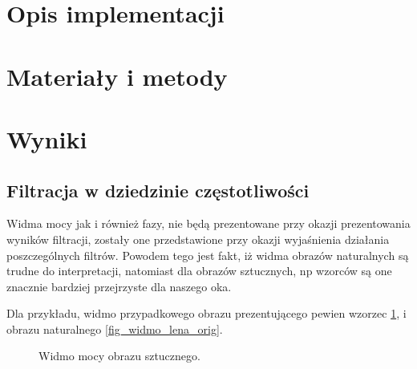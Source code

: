 \documentclass{classrep}
\begin{document}
\section{Opis implementacji}


\section{Materiały i metody}



\section{Wyniki}




\subsection{Filtracja w dziedzinie częstotliwości}

Widma mocy jak i również fazy, nie będą prezentowane przy okazji prezentowania wyników filtracji, zostały one przedstawione przy okazji wyjaśnienia działania poszczególnych filtrów. Powodem tego jest fakt, iż widma obrazów naturalnych są trudne do interpretacji, natomiast dla obrazów sztucznych, np wzorców są one znacznie bardziej przejrzyste dla naszego oka.

Dla przykładu, widmo przypadkowego obrazu prezentującego pewien wzorzec \ref{fig_pattern}, i obrazu naturalnego \ref{fig_widmo_lena_orig}.

 \begin{figure}[H]
  \centering
  \caption{Widmo mocy obrazu sztucznego.}
  \label{fig_pattern}
\end{figure}
\end{document}
